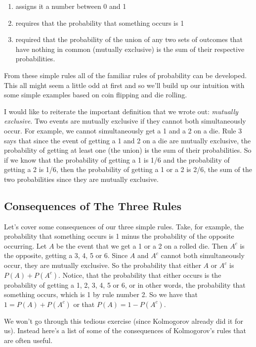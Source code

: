 \documentclass[]{article}
\begin{document}
\begin{enumerate}
\def\labelenumi{\arabic{enumi}.}
\itemsep1pt\parskip0pt
\item
  assigns it a number between 0 and 1
\item
  requires that the probability that something occurs is 1
\item
  required that the probability of the union of any two sets of outcomes
  that have nothing in common (mutually exclusive) is the sum of their
  respective probabilities.
\end{enumerate}

From these simple rules all of the familiar rules of probability can be
developed. This all might seem a little odd at first and so we'll build
up our intuition with some simple examples based on coin flipping and
die rolling.

I would like to reiterate the important definition that we wrote out:
\emph{mutually exclusive}. Two events are mutually exclusive if they
cannot both simultaneously occur. For example, we cannot simultaneously
get a 1 and a 2 on a die. Rule 3 says that since the event of getting a
1 and 2 on a die are mutually exclusive, the probability of getting at
least one (the union) is the sum of their probabilities. So if we know
that the probability of getting a 1 is 1/6 and the probability of
getting a 2 is 1/6, then the probability of getting a 1 or a 2 is 2/6,
the sum of the two probabilities since they are mutually exclusive.

\subsection{Consequences of The Three
Rules}\label{consequences-of-the-three-rules}

Let's cover some consequences of our three simple rules. Take, for
example, the probability that something occurs is 1 minus the
probability of the opposite occurring. Let $A$ be the event that we get
a 1 or a 2 on a rolled die. Then $A^c$ is the opposite, getting a 3, 4,
5 or 6. Since $A$ and $A^c$ cannot both simultaneously occur, they are
mutually exclusive. So the probability that either $A$ or $A^c$ is
$P(A) + P(A^c)$. Notice, that the probability that either occurs is the
probability of getting a 1, 2, 3, 4, 5 or 6, or in other words, the
probability that something occurs, which is 1 by rule number 2. So we
have that $1 = P(A) + P(A^c)$ or that $P(A) = 1 - P(A^c)$.

We won't go through this tedious exercise (since Kolmogorov already did
it for us). Instead here's a list of some of the consequences of
Kolmogorov's rules that are often useful.
\end{document}
